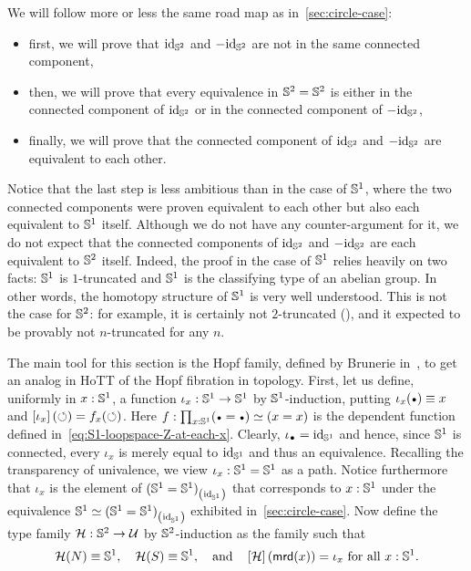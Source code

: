 \documentclass[english,a4]{article}
\renewcommand{\ap}[1]{\left[{#1}\right]}
\begin{document}
We will follow more or less the same road map as
in~\cref{sec:circle-case}:
\begin{itemize}
\item first, we will prove that $\mathord{\mathrm{id}}_{{\mathbb S^{2}}}$ and $-\mathord{\mathrm{id}}_{{\mathbb S^{2}}}$ are not in
  the same connected component,
\item then, we will prove that every equivalence in ${{\mathbb S^{2}}}={{\mathbb S^{2}}}$ is
  either in the connected component of $\mathord{\mathrm{id}}_{{\mathbb S^{2}}}$ or in the connected
  component of $-\mathord{\mathrm{id}}_{{\mathbb S^{2}}}$,
\item finally, we will prove that the connected component of $\mathord{\mathrm{id}}_{{\mathbb S^{2}}}$
  and $-\mathord{\mathrm{id}}_{{\mathbb S^{2}}}$ are equivalent to each other.
\end{itemize}
Notice that the last step is less ambitious than in the case of ${{\mathbb S^{1}}}$,
where the two connected components were proven equivalent to each
other but also each equivalent to ${{\mathbb S^{1}}}$ itself. Although we do not
have any counter-argument for it, we do not expect that the connected
components of $\mathord{\mathrm{id}}_{{\mathbb S^{2}}}$ and $-\mathord{\mathrm{id}}_{{\mathbb S^{2}}}$ are each equivalent to ${{\mathbb S^{2}}}$
itself. Indeed, the proof in the case of ${{\mathbb S^{1}}}$ relies heavily on two
facts: ${{\mathbb S^{1}}}$ is $1$-truncated and ${{\mathbb S^{1}}}$ is the classifying type of an
abelian group. In other words, the homotopy structure of ${{\mathbb S^{1}}}$ is very
well understood. This is not the case for ${{\mathbb S^{2}}}$: for example, it is
certainly not $2$-truncated (\cite{brunerie:thesis}), and it expected
to be provably not $n$-truncated for any $n$.

The main tool for this section is the Hopf family, defined by Brunerie
in~\cite{brunerie:thesis}, to get an analog in HoTT of the Hopf
fibration in topology. First, let us define, uniformly in $x:{{\mathbb S^{1}}}$, a
function $\iota_x: {{\mathbb S^{1}}}\to{{\mathbb S^{1}}}$ by ${{\mathbb S^{1}}}$-induction, putting
$\iota_x(\base) \jdeq x$ and $\ap{\iota_x}(\Sloop) = f_x(\Sloop)$.
Here $f\from \prod_{x\from\Sc} (\base=\base) \weq (x=x)$ is the
dependent function defined in~\cref{eq:S1-loopspace-Z-at-each-x}.
Clearly, $\iota_{\base}=\id_{\Sc}$ and hence, since ${{\mathbb S^{1}}}$ is connected, 
every $\iota_x$ is merely equal to $\mathord{\mathrm{id}}_{{{\mathbb S^{1}}}}$ and thus an equivalence.
Recalling the transparency of univalence, 
we view $\iota_x: {{\mathbb S^{1}}}={{\mathbb S^{1}}}$ as a path.
Notice furthermore that $\iota_x$ is the element
of ${({{\mathbb S^{1}}}={{\mathbb S^{1}}})}_{\left(\mathord{\mathrm{id}}_{{\mathbb S^{1}}}\right)}$ that corresponds to $x:{{\mathbb S^{1}}}$
under the equivalence ${{\mathbb S^{1}}} \simeq {({{\mathbb S^{1}}}={{\mathbb S^{1}}})}_{\left(\mathord{\mathrm{id}}_{{\mathbb S^{1}}}\right)}$
exhibited in~\cref{sec:circle-case}. Now define the type family
${\mathcal H}: {{\mathbb S^{2}}} \to \mathcal{U}$ by ${{\mathbb S^{2}}}$-induction as the family such that
\begin{displaymath}
  \hopf(N) \jdeq \Sc,\quad
  \hopf(S) \jdeq \Sc,\quad\text{and}\quad
  \ap\hopf (\mrd(x)) = \iota_x\ \text{for all}\ x:\Sc.
\end{displaymath}
\end{document}
